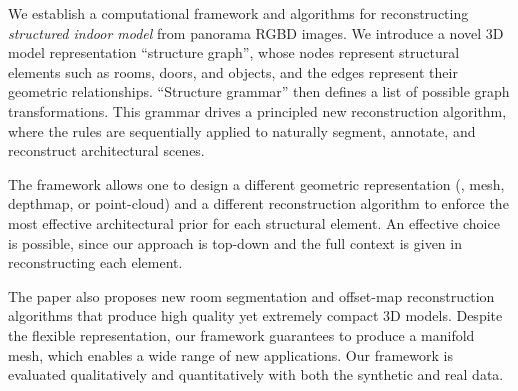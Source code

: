 We establish a computational framework and algorithms for reconstructing
{\it structured indoor model} from panorama RGBD images.
We introduce a novel 3D model representation ``structure graph'', whose
nodes represent structural elements such as rooms, doors, and objects,
and the edges represent their geometric relationships. ``Structure
grammar'' then defines a list of possible graph transformations. This
grammar drives a principled new reconstruction algorithm, where the
rules are sequentially applied to naturally segment, annotate, and
reconstruct architectural scenes. 

 
The framework allows one to design a different geometric representation
(\eg, mesh, depthmap, or point-cloud) and a different reconstruction
algorithm to enforce the most effective architectural prior for each
structural element. An effective choice is possible, since our approach
is top-down and the full context is given in reconstructing each
element. 


The paper also proposes new room segmentation and offset-map
reconstruction algorithms that produce high quality yet extremely compact
3D models.
%
Despite the flexible representation, our framework guarantees to produce
a manifold mesh, which enables a wide range of new applications. Our
framework is evaluated qualitatively and quantitatively with both the
synthetic and real data.

